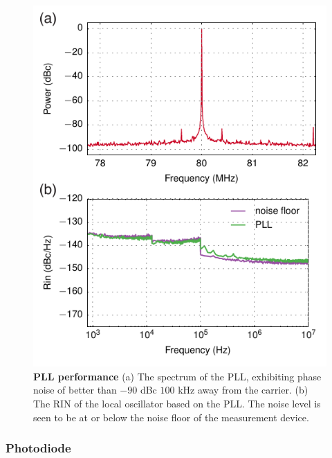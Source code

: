\documentclass[twocolumn,aps,pra,showpacs,preprintnumbers,bibnotes]{revtex4-1}
\begin{document}
\begin{figure}
  \begin{center}
    \includegraphics{fig/pll.pdf}
    \caption{\textbf{PLL performance} (a) The spectrum of the PLL, exhibiting phase noise of better than $-90$ dBc $100$ kHz away from the carrier. (b) The RIN of the local oscillator based on the PLL. The noise level is seen to be at or below the noise floor of the measurement device.}\label{fig:pll}
  \end{center}
\end{figure}

\subsubsection{Photodiode}
\end{document}
